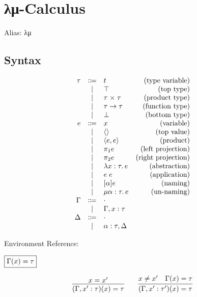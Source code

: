 \section{λμ-Calculus}

Alias: λμ \cite{Selinger:2001}\cite{Rocheteau:2005}

\subsection{Syntax}

\begin{align*}
  \begin{array}{rclr}
  \tau
  & \Coloneq & t &(\text{type variable}) \\
  & \mid & \top &(\text{top type}) \\
  & \mid & \tau \multi \tau &(\text{product type}) \\
  & \mid & \tau \to \tau &(\text{function type}) \\
  & \mid & \bot &(\text{bottom type}) \\
  e
  & \Coloneq & x &(\text{variable}) \\
  & \mid & \langle\rangle &(\text{top value}) \\
  & \mid & \langle e, e\rangle &(\text{product}) \\
  & \mid & \pi_1 e &(\text{left projection}) \\
  & \mid & \pi_2 e &(\text{right projection}) \\
  & \mid & \lambda x: \tau\ldotp e &(\text{abstraction}) \\
  & \mid & e\; e &(\text{application}) \\
  & \mid & [\alpha] e &(\text{naming}) \\
  & \mid & \mu \alpha: \tau\ldotp e &(\text{un-naming}) \\
  \Gamma
  & \Coloneq & \cdot \\
  & \mid & \Gamma, x: \tau \\
  \Delta
  & \Coloneq & \cdot \\
  & \mid & \alpha: \tau, \Delta
  \end{array}
\end{align*}

Environment Reference:

$\fbox{$\Gamma(x) = \tau$}$

\begin{gather*}
  \infer{(\Gamma, x': \tau)(x) = \tau}{
    x = x'
  }
  \hspace{2em}
  \infer{(\Gamma, x': \tau')(x) = \tau}{
    x \neq x'
    &
    \Gamma(x) = \tau
  }
\end{gather*}


